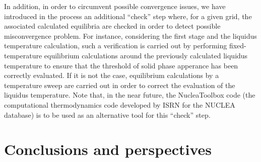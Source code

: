 \documentclass[11pt]{article}\usepackage{geometry} \geometry{letterpaper, margin=25.4mm}
\begin{document}
In addition, in order to circumvent possible convergence issues, we have introduced in the process an additional ``check'' step where, for a given grid, the associated calculated equilibria are checked in order to detect possible misconvergence problem. For instance, considering the first stage and the liquidus temperature calculation, such a verification is carried out by performing fixed-temperature equilibrium calculations around the previously calculated liquidus temperature to ensure that the threshold of solid phase apperance has been correctly evaluated. If it is not the case, equilibrium calculations by a temperature sweep are carried out in order to correct the evaluation of the liquidus temperature. Note that, in the near future, the NucleaToolbox code (the computational thermodynamics code developed by ISRN for the NUCLEA database) is to be used as an alternative tool for this ``check'' step.



\section{Conclusions and perspectives} \label{sect:concl}
\end{document}
